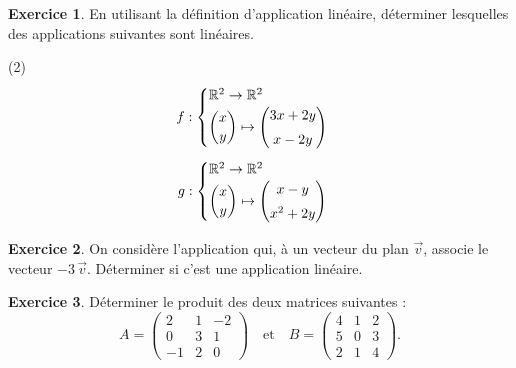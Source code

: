 \documentclass{article}
\theoremstyle{definition}
\newtheorem{exercice}{Exercice}
\begin{document}
\pagestyle{fancy}

\fancyhf{} %
\fancyhead[L]{\large \textbf{\Niveau}}
\fancyhead[C]{\large \textbf{\Chapitre}}

\large

\begin{exercice}
  En utilisant la définition d’application linéaire, déterminer lesquelles des applications suivantes sont linéaires.
  \begin{tasks}(2)
    \task[]
    \[
      f :
      \begin{cases}
        \mathbb{R}^2\to\mathbb{R}^2\\
        \dbinom{x}{y}\mapsto
        \begin{pmatrix}
          3x + 2y\\[3pt]
          x - 2y
        \end{pmatrix}
      \end{cases}
    \]
    \task[]
    \[
      g :
      \begin{cases}
        \mathbb{R}^2\to\mathbb{R}^2\\
        \dbinom{x}{y}\mapsto
        \begin{pmatrix}
          x - y\\[3pt]
          x^2 + 2y
        \end{pmatrix}
      \end{cases}
    \]
  \end{tasks}
\end{exercice}

\vfill

\begin{exercice}
  On considère l’application qui, à un vecteur du plan $\vec v$, associe le vecteur $-3\,\vec v$. Déterminer si c’est une application linéaire.
\end{exercice}

\vfill

\begin{exercice}
  Déterminer le produit des deux matrices suivantes :
  \[
    A=
    \begin{pmatrix}
      2 & 1 & -2\\[3pt]
      0 & 3 & 1\\[3pt]
      -1 & 2 & 0
    \end{pmatrix}
    \quad\text{et}\quad
    B=
    \begin{pmatrix}
      4 & 1 & 2\\[3pt]
      5 & 0 & 3\\[3pt]
      2 & 1 & 4
    \end{pmatrix}.
  \]
\end{exercice}
\end{document}
